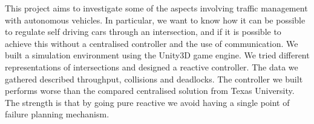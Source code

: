 \begin{em}
This project aims to investigate some of the aspects involving traffic management with autonomous vehicles.
In particular, we want to know how it can be possible to regulate self driving cars through an intersection, and if it is possible to achieve this without a centralised controller and the use of communication.
We built a simulation environment using the Unity3D game engine. We tried different representations of intersections and designed a reactive controller.
The data we gathered described throughput, collisions and deadlocks.
The controller we built performs worse than the compared centralised solution from Texas University.
The strength is that by going pure reactive we avoid having a single point of failure planning mechanism.
\end{em}
